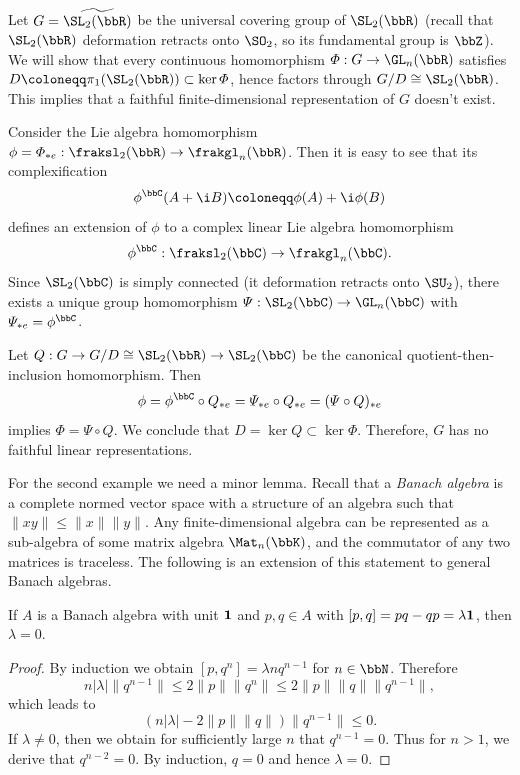 \begin{example}\label{ex SL2R nonlinear}
    Let $G=\widetilde{\SL_2(\bbR)}$ be the universal covering group of $\SL_2(\bbR)$ (recall that $\SL_2(\bbR)$ deformation retracts onto $\SO_2$, so its fundamental group is $\bbZ$). We will show that every continuous homomorphism $\varPhi:G\to \GL_n(\bbR)$ satisfies $D\coloneqq \pi_1(\SL_2(\bbR))\subset \ker\varPhi$, hence factors through $G\slash D\cong \SL_2(\bbR)$. This implies that a faithful finite-dimensional representation of $G$ doesn't exist.

    Consider the Lie algebra homomorphism $\phi=\varPhi_{\ast e}:\fraksl_2(\bbR)\to \frakgl_n(\bbR)$. Then it is easy to see that its complexification 
    \[\phi^\bbC (A+\i B)\coloneqq \phi(A)+\i \phi(B)\]
    defines an extension of $\phi$ to a complex linear Lie algebra homomorphism 
    \[\phi^\bbC:\fraksl_2(\bbC)\to \frakgl_n(\bbC).\]
    Since $\SL_2(\bbC)$ is simply connected (it deformation retracts onto $\SU_2$), there exists a unique group homomorphism $\varPsi:\SL_2(\bbC)\to \GL_n(\bbC)$ with $\varPsi_{\ast e}=\phi^\bbC$. 

    Let $Q:G\to G\slash D\cong \SL_2(\bbR)\to \SL_2(\bbC)$ be the canonical quotient-then-inclusion homomorphism. Then 
    \[\phi=\phi^\bbC\circ Q_{\ast e}=\varPsi_{\ast e}\circ Q_{\ast e}=(\varPsi\circ Q)_{\ast e}\]
    implies $\varPhi=\varPsi\circ Q$. We conclude that $D=\ker Q\subset \ker\varPhi$. Therefore, $G$ has no faithful linear representations.
\end{example}


For the second example we need a minor lemma. Recall that a \emph{Banach algebra} is a complete normed vector space with a structure of an algebra such that $\lVert xy\rVert\leq \lVert x\rVert \lVert y\rVert$. Any finite-dimensional algebra can be represented as a sub-algebra of some matrix algebra $\Mat_n(\bbK)$, and the commutator of any two matrices is traceless. The following is an extension of this statement to general Banach algebras.

\begin{lem}
    If $A$ is a Banach algebra with unit $\bf{1}$ and $p,q\in A$ with $[p,q]=pq-qp=\lambda \bf{1}$, then $\lambda=0$.
\end{lem}
\begin{proof}
    By induction we obtain $[p,q^n]=\lambda nq^{n-1}$ for $n\in\bbN$. Therefore
    \[n|\lambda|\lVert q^{n-1}\rVert\leq 2\lVert p\rVert \lVert q^n\rVert\leq 2\lVert p\rVert \lVert q\rVert \lVert q^{n-1}\rVert,\]
    which leads to
    \[\left(n|\lambda|-2\lVert p\rVert \lVert q\rVert\right)\lVert q^{n-1}\rVert \leq 0.\]
    If $\lambda\neq 0$, then we obtain for sufficiently large $n$ that $q^{n-1}=0$. Thus for $n>1$, we derive that $q^{n-2}=0$. By induction, $q=0$ and hence $\lambda=0$.
\end{proof}



